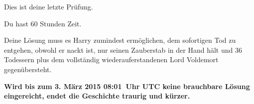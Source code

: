 {%
\setlength{\parindent}{0pt}\setlength{\parskip}{.5\baselineskip}

Dies ist deine letzte Prüfung.%

Du hast 60 Stunden Zeit.

Deine Lösung muss es Harry zumindest ermöglichen, dem sofortigen Tod zu entgehen, obwohl er nackt ist, nur seinen Zauberstab in der Hand hält und 36 Todessern plus dem vollständig wiederauferstandenen Lord Voldemort gegenübersteht.



\textbf{Wird bis zum 3. März 2015 08:01~Uhr UTC keine brauchbare Lösung eingereicht, endet die Geschichte traurig und kürzer.}

}

